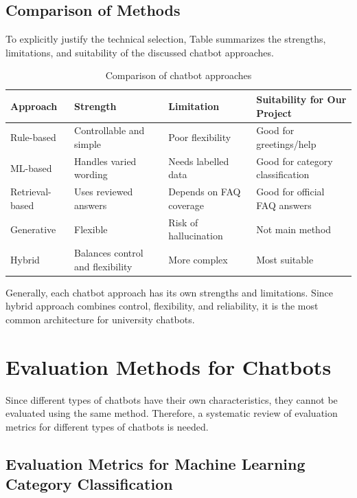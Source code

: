 \documentclass[12pt,a4paper]{article}
\begin{document}
\subsection{Comparison of Methods}

To explicitly justify the technical selection, Table summarizes the strengths, limitations, and suitability of the discussed chatbot approaches.

\begin{table}[htbp]
    \centering
    \caption{Comparison of chatbot approaches}
    \label{tab:method-comparison}
    \renewcommand{\arraystretch}{1.25}
    \small
    \begin{tabularx}{\textwidth}{>{\raggedright\arraybackslash}p{}YYY}
        \toprule
        \textbf{Approach} & \textbf{Strength} & \textbf{Limitation} & \textbf{Suitability for Our Project} \\
        \midrule
        Rule-based & Controllable and simple & Poor flexibility & Good for greetings/help \\
        ML-based & Handles varied wording & Needs labelled data & Good for category classification \\
        Retrieval-based & Uses reviewed answers & Depends on FAQ coverage & Good for official FAQ answers \\
        Generative & Flexible & Risk of hallucination & Not main method \\
        Hybrid & Balances control and flexibility & More complex & Most suitable \\
        \bottomrule
    \end{tabularx}
\end{table}

Generally, each chatbot approach has its own strengths and limitations. Since hybrid approach combines control, flexibility, and reliability, it is the most common architecture for university chatbots.

\section{Evaluation Methods for Chatbots}

Since different types of chatbots have their own characteristics, they cannot be evaluated using the same method. 
Therefore, a systematic review of evaluation metrics for different types of chatbots is needed.

\subsection{Evaluation Metrics for Machine Learning Category Classification}
\end{document}
